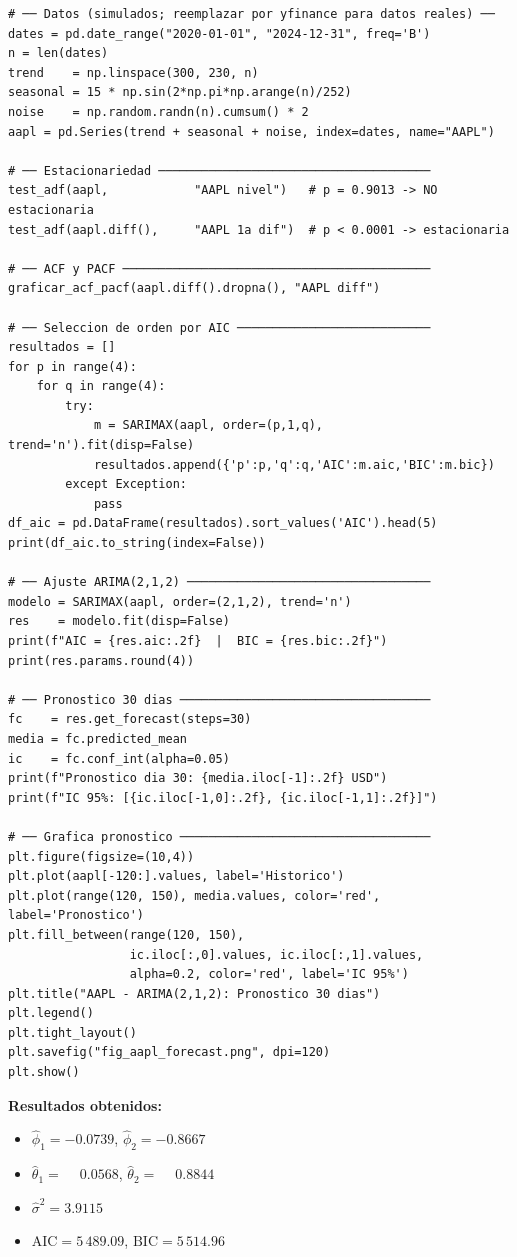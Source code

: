 \documentclass[12pt,a4paper]{article}
\begin{document}
\begin{lstlisting}[caption={Ejemplo 1 --- ARIMA$(2,1,2)$ para AAPL}]
# ── Datos (simulados; reemplazar por yfinance para datos reales) ──
dates = pd.date_range("2020-01-01", "2024-12-31", freq='B')
n = len(dates)
trend    = np.linspace(300, 230, n)
seasonal = 15 * np.sin(2*np.pi*np.arange(n)/252)
noise    = np.random.randn(n).cumsum() * 2
aapl = pd.Series(trend + seasonal + noise, index=dates, name="AAPL")

# ── Estacionariedad ──────────────────────────────────────
test_adf(aapl,            "AAPL nivel")   # p = 0.9013 -> NO estacionaria
test_adf(aapl.diff(),     "AAPL 1a dif")  # p < 0.0001 -> estacionaria

# ── ACF y PACF ───────────────────────────────────────────
graficar_acf_pacf(aapl.diff().dropna(), "AAPL diff")

# ── Seleccion de orden por AIC ───────────────────────────
resultados = []
for p in range(4):
    for q in range(4):
        try:
            m = SARIMAX(aapl, order=(p,1,q), trend='n').fit(disp=False)
            resultados.append({'p':p,'q':q,'AIC':m.aic,'BIC':m.bic})
        except Exception:
            pass
df_aic = pd.DataFrame(resultados).sort_values('AIC').head(5)
print(df_aic.to_string(index=False))

# ── Ajuste ARIMA(2,1,2) ──────────────────────────────────
modelo = SARIMAX(aapl, order=(2,1,2), trend='n')
res    = modelo.fit(disp=False)
print(f"AIC = {res.aic:.2f}  |  BIC = {res.bic:.2f}")
print(res.params.round(4))

# ── Pronostico 30 dias ───────────────────────────────────
fc    = res.get_forecast(steps=30)
media = fc.predicted_mean
ic    = fc.conf_int(alpha=0.05)
print(f"Pronostico dia 30: {media.iloc[-1]:.2f} USD")
print(f"IC 95%: [{ic.iloc[-1,0]:.2f}, {ic.iloc[-1,1]:.2f}]")

# ── Grafica pronostico ───────────────────────────────────
plt.figure(figsize=(10,4))
plt.plot(aapl[-120:].values, label='Historico')
plt.plot(range(120, 150), media.values, color='red', label='Pronostico')
plt.fill_between(range(120, 150),
                 ic.iloc[:,0].values, ic.iloc[:,1].values,
                 alpha=0.2, color='red', label='IC 95%')
plt.title("AAPL - ARIMA(2,1,2): Pronostico 30 dias")
plt.legend()
plt.tight_layout()
plt.savefig("fig_aapl_forecast.png", dpi=120)
plt.show()
\end{lstlisting}

\textbf{Resultados obtenidos:}
\begin{itemize}
  \item $\hat{\phi}_1 = -0.0739$, \quad $\hat{\phi}_2 = -0.8667$
  \item $\hat{\theta}_1 = \phantom{-}0.0568$, \quad $\hat{\theta}_2 = \phantom{-}0.8844$
  \item $\hat{\sigma}^2 = 3.9115$
  \item $\mathrm{AIC} = 5\,489.09$, \quad $\mathrm{BIC} = 5\,514.96$
\end{itemize}
\end{document}
